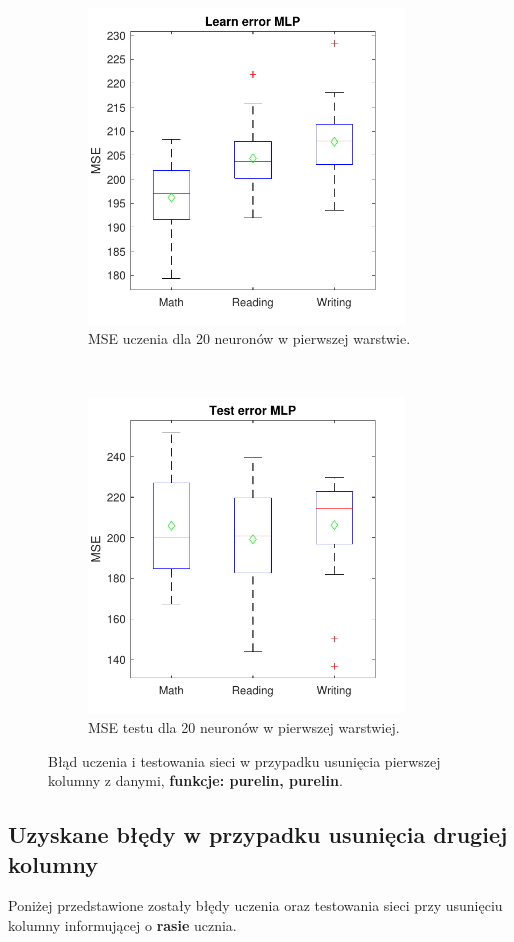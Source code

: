 \documentclass[12pt]{article}
\begin{document}
\begin{figure}[H]
\centering
\begin{subfigure}[t]{0.48\textwidth} 
\centering
\includegraphics[height=3.3in]{purelin_purelin_20_without_1_learnBoxplot.pdf}
\caption{MSE uczenia dla  20 neuronów w pierwszej warstwie.}
\end{subfigure}
~~
\begin{subfigure}[t]{0.48\textwidth} 
\centering
\includegraphics[height=3.3in]{purelin_purelin_20_without_1_testBoxplot.pdf}
\caption{MSE testu dla  20  neuronów w pierwszej warstwiej.}
\end{subfigure}

\caption{Błąd uczenia i testowania sieci w przypadku usunięcia pierwszej kolumny z danymi, \textbf{funkcje: purelin, purelin}.}
\end{figure}

\pagebreak
\subsection{Uzyskane błędy w przypadku usunięcia drugiej  kolumny}
Poniżej przedstawione zostały błędy uczenia oraz testowania sieci przy usunięciu kolumny informującej o \textbf{rasie} ucznia.
\end{document}
